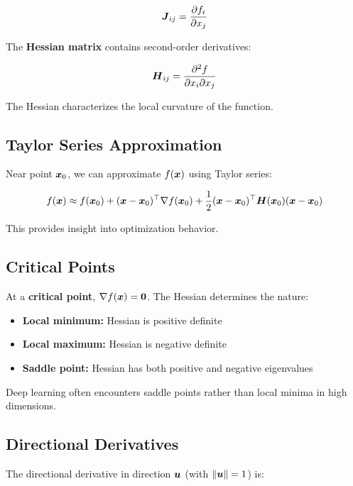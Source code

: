 \begin{equation}
\boldsymbol{J}_{ij} = \frac{\partial f_i}{\partial x_j}
\end{equation}

The \textbf{Hessian matrix} contains second-order derivatives:

\begin{equation}
\boldsymbol{H}_{ij} = \frac{\partial^2 f}{\partial x_i \partial x_j}
\end{equation}

The Hessian characterizes the local curvature of the function.

\subsection{Taylor Series Approximation}

Near point $\boldsymbol{x}_0$, we can approximate $f(\boldsymbol{x})$ using Taylor series:

\begin{equation}
f(\boldsymbol{x}) \approx f(\boldsymbol{x}_0) + (\boldsymbol{x} - \boldsymbol{x}_0)^\top \nabla f(\boldsymbol{x}_0) + \frac{1}{2}(\boldsymbol{x} - \boldsymbol{x}_0)^\top \boldsymbol{H}(\boldsymbol{x}_0) (\boldsymbol{x} - \boldsymbol{x}_0)
\end{equation}

This provides insight into optimization behavior.

\subsection{Critical Points}

At a \textbf{critical point}, $\nabla f(\boldsymbol{x}) = \boldsymbol{0}$. The Hessian determines the nature:
\begin{itemize}
    \item \textbf{Local minimum:} Hessian is positive definite
    \item \textbf{Local maximum:} Hessian is negative definite
    \item \textbf{Saddle point:} Hessian has both positive and negative eigenvalues
\end{itemize}

Deep learning often encounters saddle points rather than local minima in high dimensions.

\subsection{Directional Derivatives}

The directional derivative in direction $\boldsymbol{u}$ (with $\|\boldsymbol{u}\| = 1$) is:

